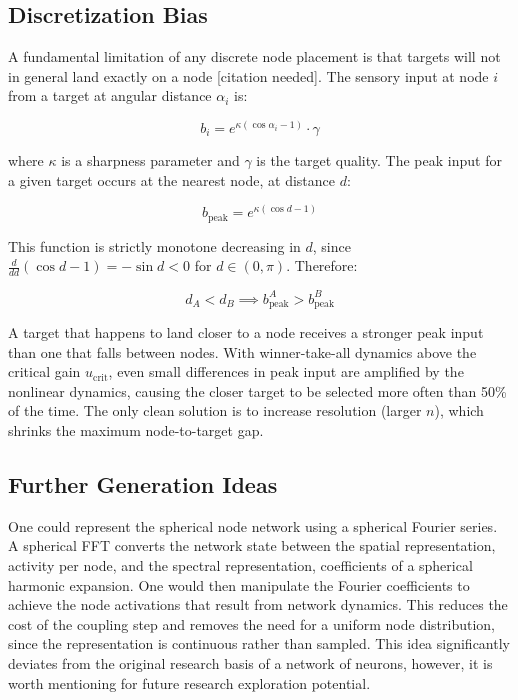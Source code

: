 \documentclass[12pt, letterpaper]{article}
\begin{document}
\subsection{Discretization Bias}

A fundamental limitation of any discrete node placement is that targets will not in general land exactly on a node [citation needed]. The sensory input at node $i$ from a target at angular distance $\alpha_i$ is:

\begin{equation}
    b_i = e^{\kappa(\cos \alpha_i - 1)} \cdot \gamma
\end{equation}

where $\kappa$ is a sharpness parameter and $\gamma$ is the target quality. The peak input for a given target occurs at the nearest node, at distance $d$:

\begin{equation}
    b_{\text{peak}} = e^{\kappa(\cos d - 1)}
\end{equation}

This function is strictly monotone decreasing in $d$, since $\frac{d}{dd}(\cos d - 1) = -\sin d < 0$ for $d \in (0, \pi)$. Therefore:

\begin{equation}
    d_A < d_B \implies b_{\text{peak}}^A > b_{\text{peak}}^B
\end{equation}

A target that happens to land closer to a node receives a stronger peak input than one that falls between nodes. With winner-take-all dynamics above the critical gain $u_{\text{crit}}$, even small differences in peak input are amplified by the nonlinear dynamics, causing the closer target to be selected more often than 50\% of the time. The only clean solution is to increase resolution (larger $n$), which shrinks the maximum node-to-target gap.

\subsection{Further Generation Ideas}
One could represent the spherical node network using a spherical Fourier series. A spherical FFT converts the network state between the spatial representation, activity per node, and the spectral representation, coefficients of a spherical harmonic expansion. One would then manipulate the Fourier coefficients to achieve the node activations that result from network dynamics. This reduces the cost of the coupling step and removes the need for a uniform node distribution, since the representation is continuous rather than sampled. This idea significantly deviates from the original research basis of a network of neurons, however, it is worth mentioning for future research exploration potential.
\end{document}
